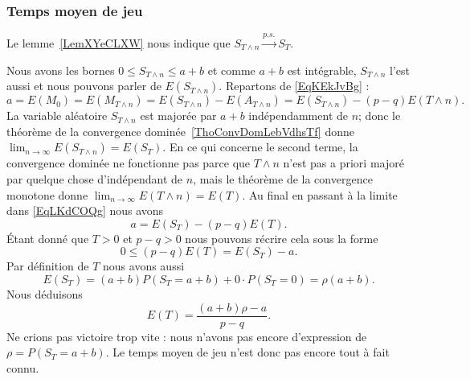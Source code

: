 \subsubsection{Temps moyen de jeu}

Le lemme~\ref{LemXYeCLXW} nous indique que \( S_{T\wedge n}\stackrel{p.s.}{\longrightarrow}S_T\).

Nous avons les bornes \( 0\leq S_{T\wedge n}\leq a+b\) et comme \( a+b\) est intégrable, \( S_{T\wedge n}\) l'est aussi et nous pouvons parler de \( E(S_{T\wedge n})\). Repartons de \eqref{EqKEkJvBg} :
\begin{equation}    \label{EqLKdCOQg}
    a=E(M_0)=E(M_{T\wedge n})=E(S_{T\wedge n})-E(A_{T\wedge n})=E(S_{T\wedge n})-(p-q)E(T\wedge n).
\end{equation}
La variable aléatoire \( S_{T\wedge n}\) est majorée par \( a+b\) indépendamment de \( n\); donc le théorème de la convergence dominée~\ref{ThoConvDomLebVdhsTf} donne \( \lim_{n\to \infty} E(S_{T\wedge n})=E(S_T)\). En ce qui concerne le second terme, la convergence dominée ne fonctionne pas parce que \( T\wedge n\) n'est pas a priori majoré par quelque chose d'indépendant de \( n\), mais le théorème de la convergence monotone donne \( \lim_{n\to \infty} E(T\wedge n)=E(T)\). Au final en passant à la limite dans \eqref{EqLKdCOQg} nous avons
\begin{equation}
    a=E(S_T)-(p-q)E(T).
\end{equation}
Étant donné que \( T>0\) et \( p-q>0\) nous pouvons récrire cela sous la forme
\begin{equation}
    0\leq (p-q)E(T)=E(S_T)-a.
\end{equation}
Par définition de \( T\) nous avons aussi
\begin{equation}
    E(S_T)=(a+b)P(S_T=a+b)+0\cdot P(S_T=0)=\rho(a+b).
\end{equation}
Nous déduisons
\begin{equation}    \label{EqRHUVuKv}
    E(T)=\frac{ (a+b)\rho-a }{ p-q }.
\end{equation}
Ne crions pas victoire trop vite : nous n'avons pas encore d'expression de \( \rho=P(S_T=a+b)\). Le temps moyen de jeu n'est donc pas encore tout à fait connu.

